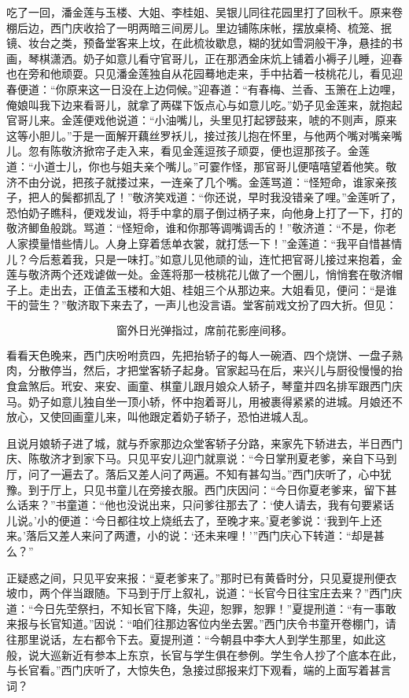 吃了一回，潘金莲与玉楼、大姐、李桂姐、吴银儿同往花园里打了回秋千。原来卷棚后边，西门庆收拾了一明两暗三间房儿。里边铺陈床帐，摆放桌椅、梳笼、抿镜、妆台之类，预备堂客来上坟，在此梳妆歇息，糊的犹如雪洞般干净，悬挂的书画，琴棋潇洒。奶子如意儿看守官哥儿，正在那洒金床炕上铺着小褥子儿睡，迎春也在旁和他顽耍。只见潘金莲独自从花园蓦地走来，手中拈着一枝桃花儿，看见迎春便道：“你原来这一日没在上边伺候。”迎春道：“有春梅、兰香、玉箫在上边哩，俺娘叫我下边来看哥儿，就拿了两碟下饭点心与如意儿吃。”奶子见金莲来，就抱起官哥儿来。金莲便戏他说道：“小油嘴儿，头里见打起锣鼓来，唬的不则声，原来这等小胆儿。”于是一面解开藕丝罗袄儿，接过孩儿抱在怀里，与他两个嘴对嘴亲嘴儿。忽有陈敬济掀帘子走入来，看见金莲逗孩子顽耍，便也逗那孩子。金莲道：“小道士儿，你也与姐夫亲个嘴儿。”可霎作怪，那官哥儿便嘻嘻望着他笑。敬济不由分说，把孩子就搂过来，一连亲了几个嘴。金莲骂道：“怪短命，谁家亲孩子，把人的鬓都抓乱了！”敬济笑戏道：“你还说，早时我没错亲了哩。”金莲听了，恐怕奶子瞧科，便戏发讪，将手中拿的扇子倒过柄子来，向他身上打了一下，打的敬济鲫鱼般跳。骂道：“怪短命，谁和你那等调嘴调舌的！”敬济道：“不是，你老人家摸量惜些情儿。人身上穿着恁单衣裳，就打恁一下！”金莲道：“我平自惜甚情儿？今后惹着我，只是一味打。”如意儿见他顽的讪，连忙把官哥儿接过来抱着，金莲与敬济两个还戏谑做一处。金莲将那一枝桃花儿做了一个圈儿，悄悄套在敬济帽子上。走出去，正值孟玉楼和大姐、桂姐三个从那边来。大姐看见，便问：“是谁干的营生？”敬济取下来去了，一声儿也没言语。堂客前戏文扮了四大折。但见：

\[
窗外日光弹指过，席前花影座间移。
\]

看看天色晚来，西门庆吩咐贲四，先把抬轿子的每人一碗酒、四个烧饼、一盘子熟肉，分散停当，然后，才把堂客轿子起身。官家起马在后，来兴儿与厨役慢慢的抬食盒煞后。玳安、来安、画童、棋童儿跟月娘众人轿子，琴童并四名排军跟西门庆马。奶子如意儿独自坐一顶小轿，怀中抱着哥儿，用被裹得紧紧的进城。月娘还不放心，又使回画童儿来，叫他跟定着奶子轿子，恐怕进城人乱。

且说月娘轿子进了城，就与乔家那边众堂客轿子分路，来家先下轿进去，半日西门庆、陈敬济才到家下马。只见平安儿迎门就禀说：“今日掌刑夏老爹，亲自下马到厅，问了一遍去了。落后又差人问了两遍。不知有甚勾当。”西门庆听了，心中犹豫。到于厅上，只见书童儿在旁接衣服。西门庆因问：“今日你夏老爹来，留下甚么话来？”书童道：“他也没说出来，只问爹往那去了：‘使人请去，我有句要紧话儿说。’小的便道：‘今日都往坟上烧纸去了，至晚才来。’夏老爹说：‘我到午上还来。’落后又差人来问了两遭，小的说：‘还未来哩！’”西门庆心下转道：“却是甚么？”

正疑惑之间，只见平安来报：“夏老爹来了。”那时已有黄昏时分，只见夏提刑便衣坡巾，两个伴当跟随。下马到于厅上叙礼，说道：“长官今日往宝庄去来？”西门庆道：“今日先茔祭扫，不知长官下降，失迎，恕罪，恕罪！”夏提刑道：“有一事敢来报与长官知道。”因说：“咱们往那边客位内坐去罢。”西门庆令书童开卷棚门，请往那里说话，左右都令下去。夏提刑道：“今朝县中李大人到学生那里，如此这般，说大巡新近有参本上东京，长官与学生俱在参例。学生令人抄了个底本在此，与长官看。”西门庆听了，大惊失色，急接过邸报来灯下观看，端的上面写着甚言词？

